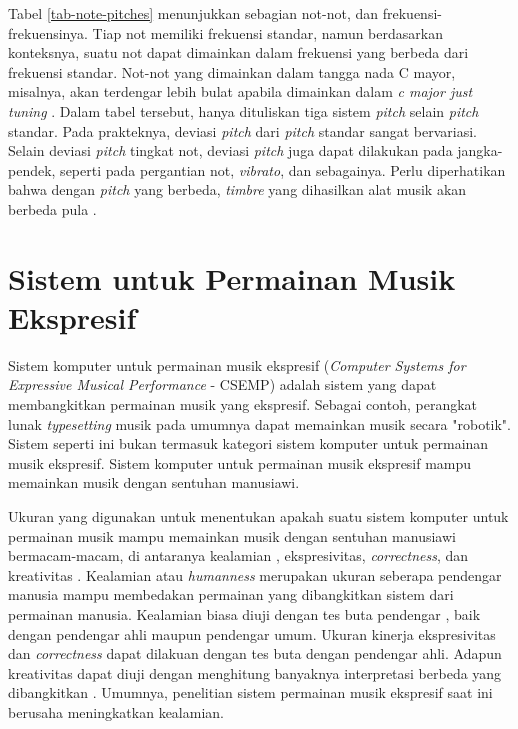 Tabel \ref{tab-note-pitches} menunjukkan sebagian not-not, dan frekuensi-frekuensinya. Tiap not memiliki frekuensi standar, namun berdasarkan konteksnya, suatu not dapat dimainkan dalam frekuensi yang berbeda dari frekuensi standar. Not-not yang dimainkan dalam tangga nada C mayor, misalnya, akan terdengar lebih bulat apabila dimainkan dalam \textit{c major just tuning} \parencite{benward2003music} \parencite{jorgensen1991tuning}. Dalam tabel tersebut, hanya dituliskan tiga sistem \textit{pitch} selain \textit{pitch} standar. Pada prakteknya, deviasi \textit{pitch} dari \textit{pitch} standar sangat bervariasi. Selain deviasi \textit{pitch} tingkat not, deviasi \textit{pitch} juga dapat dilakukan pada jangka-pendek, seperti pada pergantian not, \textit{vibrato}, dan sebagainya. Perlu diperhatikan bahwa dengan \textit{pitch} yang berbeda, \textit{timbre} yang dihasilkan alat musik akan berbeda pula \parencite{setharestuningtimbre}.

\section{Sistem untuk Permainan Musik Ekspresif}\label{sectioncsemp}

Sistem komputer untuk permainan musik ekspresif (\textit{Computer Systems for Expressive Musical Performance} - CSEMP) adalah sistem yang dapat membangkitkan permainan musik yang ekspresif. Sebagai contoh, perangkat lunak \textit{typesetting} musik pada umumnya dapat memainkan musik secara "robotik". Sistem seperti ini bukan termasuk kategori sistem komputer untuk permainan musik ekspresif. Sistem komputer untuk permainan musik ekspresif mampu memainkan musik dengan sentuhan manusiawi. \parencite{miranda2010}

Ukuran yang digunakan untuk menentukan apakah suatu sistem komputer untuk permainan musik mampu memainkan musik dengan sentuhan manusiawi bermacam-macam, di antaranya kealamian \parencite{schubert2017test}, ekspresivitas, \textit{correctness}, dan kreativitas \parencite{miranda2010}. Kealamian atau \textit{humanness} merupakan ukuran seberapa pendengar manusia mampu membedakan permainan yang dibangkitkan sistem dari permainan manusia. Kealamian biasa diuji dengan tes buta pendengar \parencite{schubert2017test}, baik dengan pendengar ahli maupun pendengar umum. Ukuran kinerja ekspresivitas dan \textit{correctness} dapat dilakuan dengan tes buta dengan pendengar ahli. Adapun kreativitas dapat diuji dengan menghitung banyaknya interpretasi berbeda yang dibangkitkan \parencite{miranda2010}. Umumnya, penelitian sistem permainan musik ekspresif saat ini berusaha meningkatkan kealamian.

